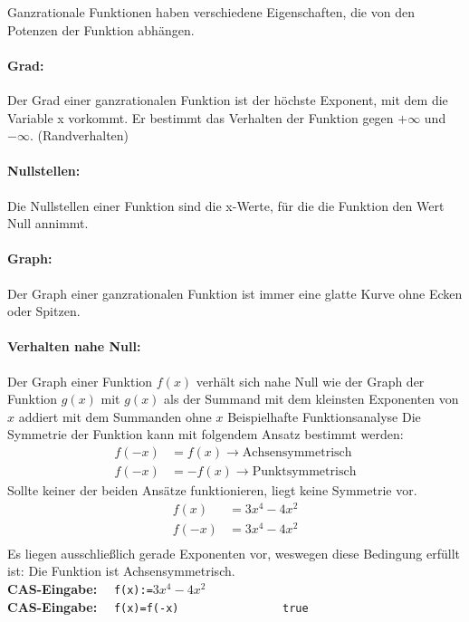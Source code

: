 \documentclass[12pt,a4paper]{report}
\newenvironment{gblock}[1]{
    \tcolorbox[beamer,
        noparskip,
        colback=green!50!,
        colbacklower=green!75!green,
        title=#1]}
{\endtcolorbox}
\newcommand{\cas}[1]{\textbf{CAS-Eingabe: }\ \ \texttt{#1}}
\begin{document}
	\begin{gblock}{Eigenschaften}
	Ganzrationale Funktionen haben verschiedene Eigenschaften, die von den Potenzen der Funktion abhängen.
	\paragraph{Grad:} Der Grad einer ganzrationalen Funktion ist der höchste Exponent, mit dem die Variable x vorkommt. Er bestimmt das Verhalten der Funktion gegen $+\infty$ und $-\infty$. (Randverhalten)
	\paragraph{Nullstellen:} Die Nullstellen einer Funktion sind die x-Werte, für die die Funktion den Wert Null annimmt.
	\paragraph{Graph:} Der Graph einer ganzrationalen Funktion ist immer eine glatte Kurve ohne Ecken oder Spitzen.
	\paragraph{Verhalten nahe Null:} Der Graph einer Funktion $f(x)$ verhält sich nahe Null wie der Graph der Funktion $g(x)$ mit $g(x)$ als der Summand mit dem kleinsten Exponenten von $x$ addiert mit dem Summanden ohne $x$
\end{gblock}
	\newpage
	\noindent
	\Large Beispielhafte Funktionsanalyse
	\large
	\begin{gblock}{Symmetrie}
		Die Symmetrie der Funktion kann mit folgendem Ansatz bestimmt werden:
		\begin{align*}
			f(-x) &= f(x) \to \text{Achsensymmetrisch} \\
			f(-x) &= -f(x) \to \text{Punktsymmetrisch}
		\end{align*}
		Sollte keiner der beiden Ansätze funktionieren, liegt keine Symmetrie vor.
		\begin{align*}
			f(x) &= 3x^4 - 4x^2 \\
			f(-x) &= 3x^4 - 4x^2 \\
		\end{align*}
		Es liegen ausschließlich gerade Exponenten vor, weswegen diese Bedingung erfüllt ist: Die Funktion ist Achsensymmetrisch.
		\\
		\cas{f(x):=$3x^4-4x^2$} \\
		\cas{f(x)=f(-x) \ \ \ \ \ \ \ \ \ \ \ \ \ \ \ true}
	\end{gblock}
\end{document}
